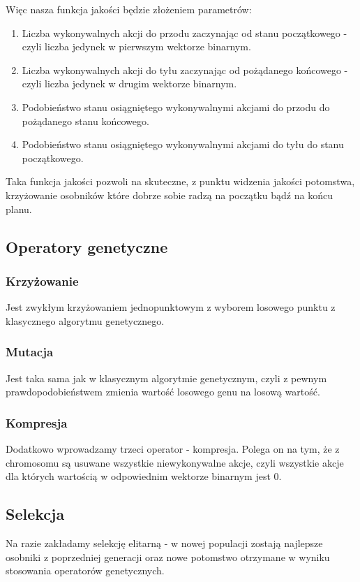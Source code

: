 \documentclass{article}
\begin{document}
Więc nasza funkcja jakości będzie złożeniem parametrów:
\begin{enumerate}
    \item Liczba wykonywalnych akcji do przodu zaczynając od stanu początkowego - czyli liczba jedynek w pierwszym wektorze binarnym.
    \item Liczba wykonywalnych akcji do tyłu zaczynając od pożądanego końcowego - czyli liczba jedynek w drugim wektorze binarnym.
    \item Podobieństwo stanu osiągniętego wykonywalnymi akcjami do przodu do pożądanego stanu końcowego.
    \item Podobieństwo stanu osiągniętego wykonywalnymi akcjami do tyłu do stanu początkowego.
\end{enumerate}
Taka funkcja jakości pozwoli na skuteczne, z punktu widzenia jakości potomstwa, krzyżowanie osobników które dobrze sobie radzą na początku bądź na końcu planu.
\subsection{Operatory genetyczne}
\subsubsection{Krzyżowanie}
Jest zwykłym krzyżowaniem jednopunktowym z wyborem losowego punktu z klasycznego algorytmu genetycznego.
\subsubsection{Mutacja}
Jest taka sama jak w klasycznym algorytmie genetycznym, czyli z pewnym prawdopodobieństwem zmienia wartość losowego genu na losową wartość.
\subsubsection{Kompresja}
Dodatkowo wprowadzamy trzeci operator - kompresja. Polega on na tym, że z chromosomu są usuwane wszystkie niewykonywalne akcje, czyli wszystkie akcje dla których wartością w odpowiednim wektorze binarnym jest 0.

\subsection{Selekcja}
Na razie zakładamy selekcję elitarną - w nowej populacji zostają najlepsze osobniki z poprzedniej generacji oraz nowe potomstwo otrzymane w wyniku stosowania operatorów genetycznych.
\end{document}
